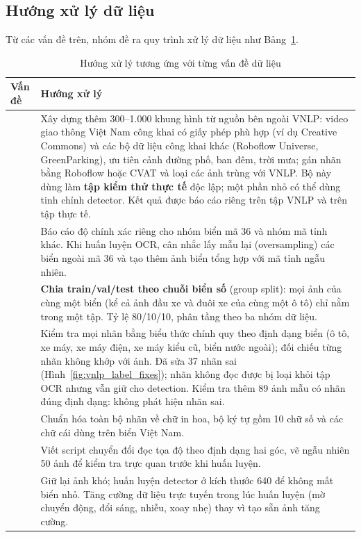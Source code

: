 \subsection{Hướng xử lý dữ liệu}

Từ các vấn đề trên, nhóm đề ra quy trình xử lý dữ liệu như Bảng~\ref{tab:vnlp_solutions}.

\begin{table}[H]
\centering
\small
\begin{tabularx}{\textwidth}{|>{\centering}p{0.8cm}|>{\RaggedRight\arraybackslash}X|}
\hline
\textbf{Vấn đề} & \textbf{Hướng xử lý} \\
\hline
1 & Xây dựng thêm 300--1.000 khung hình từ nguồn bên ngoài VNLP: video giao thông Việt Nam công khai có giấy phép phù hợp (ví dụ Creative Commons) và các bộ dữ liệu công khai khác (Roboflow Universe, GreenParking), ưu tiên cảnh đường phố, ban đêm, trời mưa; gán nhãn bằng Roboflow hoặc CVAT và loại các ảnh trùng với VNLP. Bộ này dùng làm \textbf{tập kiểm thử thực tế} độc lập; một phần nhỏ có thể dùng tinh chỉnh detector. Kết quả được báo cáo riêng trên tập VNLP và trên tập thực tế. \\
\hline
2 & Báo cáo độ chính xác riêng cho nhóm biển mã 36 và nhóm mã tỉnh khác. Khi huấn luyện OCR, cân nhắc lấy mẫu lại (oversampling) các biển ngoài mã 36 và tạo thêm ảnh biển tổng hợp với mã tỉnh ngẫu nhiên. \\
\hline
3 & \textbf{Chia train/val/test theo chuỗi biển số} (group split): mọi ảnh của cùng một biển (kể cả ảnh đầu xe và đuôi xe của cùng một ô tô) chỉ nằm trong một tập. Tỷ lệ 80/10/10, phân tầng theo ba nhóm dữ liệu. \\
\hline
4 & Kiểm tra mọi nhãn bằng biểu thức chính quy theo định dạng biển (ô tô, xe máy, xe máy điện, xe máy kiểu cũ, biển nước ngoài); đối chiếu từng nhãn không khớp với ảnh. Đã sửa 37 nhãn sai (Hình~\ref{fig:vnlp_label_fixes}); nhãn không đọc được bị loại khỏi tập OCR nhưng vẫn giữ cho detection. Kiểm tra thêm 89 ảnh mẫu có nhãn đúng định dạng: không phát hiện nhãn sai. \\
\hline
5 & Chuẩn hóa toàn bộ nhãn về chữ in hoa, bộ ký tự gồm 10 chữ số và các chữ cái dùng trên biển Việt Nam. \\
\hline
6 & Viết script chuyển đổi đọc tọa độ theo định dạng hai góc, vẽ ngẫu nhiên 50 ảnh để kiểm tra trực quan trước khi huấn luyện. \\
\hline
7 & Giữ lại ảnh khó; huấn luyện detector ở kích thước 640 để không mất biển nhỏ. Tăng cường dữ liệu trực tuyến trong lúc huấn luyện (mờ chuyển động, đổi sáng, nhiễu, xoay nhẹ) thay vì tạo sẵn ảnh tăng cường. \\
\hline
\end{tabularx}
\caption{Hướng xử lý tương ứng với từng vấn đề dữ liệu}
\label{tab:vnlp_solutions}
\end{table}


